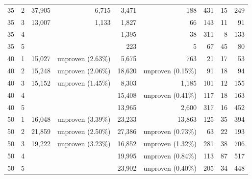 \documentclass[11pt]{article}
\begin{document}
\begin{table}[ht]
\begin{tabular}{rr rr rr rrr}
35 & 2 & 37,905 & 6,715 & 3,471 & 188 & 431 & 15 & 249\\
35 & 3 & 13,007 & 1,133 & 1,827 & 66 & 143 & 11 & 91\\
35 & 4 &  &  & 1,395 & 38 & 311 & 8 & 133\\
35 & 5 &  &  & 223 & 5 & 67 & 45 & 80\\
40 & 1 & 15,027 & unproven (2.63\%) & 5,675 & 763 & 21 & 17 & 53\\
40 & 2 & 15,248 & unproven (2.06\%) & 18,620 & unproven (0.15\%) & 91 & 18 & 94\\
40 & 3 & 15,152 & unproven (1.45\%) & 8,303 & 1,185 & 101 & 12 & 155\\
40 & 4 &  &  & 15,408 & unproven (0.41\%) & 117 & 18 & 163\\
40 & 5 &  &  & 13,965 & 2,600 & 317 & 16 & 452\\
50 & 1 & 16,048 & unproven (3.39\%) & 23,233 & 13,863 & 125 & 35 & 394\\
50 & 2 & 21,859 & unproven (2.50\%) & 27,386 & unproven (0.73\%) & 63 & 22 & 193\\
50 & 3 & 19,222 & unproven (3.23\%) & 16,852 & unproven (1.32\%) & 281 & 38 & 706\\
50 & 4 &  &  & 19,995 & unproven (0.84\%) & 113 & 87 & 517\\
50 & 5 &  &  & 23,902 & unproven (0.40\%) & 205 & 34 & 448\\
\bottomrule
\end{tabular}
\end{table}
\end{document}

